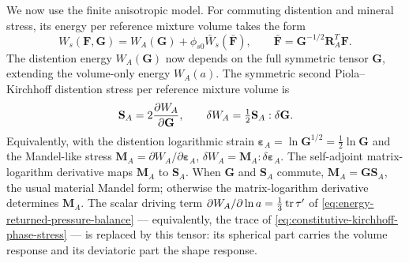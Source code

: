 We now use the finite anisotropic model. For commuting distention and mineral
stress, its energy per reference mixture volume takes the form
\begin{equation}
 W_s(\mathbf F,\mathbf G)=W_A(\mathbf G)
   +\phi_{s0}\bar W_s(\bar{\mathbf F}),\qquad
 \bar{\mathbf F}=\mathbf G^{-1/2}\mathbf R_A^T\mathbf F.
 \label{eq:fabric-equivalent-energy}
\end{equation}
The distention energy \(W_A(\mathbf G)\) now depends on the full symmetric
tensor \(\mathbf G\), extending the volume-only energy \(W_A(a)\). The
symmetric second Piola--Kirchhoff distention stress per reference mixture
volume is
\begin{equation}
 \mathbf S_A=2\frac{\partial W_A}{\partial \mathbf G},\qquad
 \delta W_A=\tfrac12\mathbf S_A:\delta\mathbf G.
 \label{eq:fabric-distention-stress}
\end{equation}
Equivalently, with the distention logarithmic strain
\(\mathbf\varepsilon_A=\ln\mathbf G^{1/2}=\tfrac12\ln\mathbf G\) and
the Mandel-like stress \(\mathbf M_A=\partial W_A/\partial\mathbf\varepsilon_A\),
\(\delta W_A=\mathbf M_A:\delta\mathbf\varepsilon_A\). The self-adjoint
matrix-logarithm derivative maps \(\mathbf M_A\) to \(\mathbf S_A\).
When \(\mathbf G\) and
\(\mathbf S_A\) commute, \(\mathbf M_A=\mathbf G\mathbf S_A\), the
usual material Mandel form; otherwise the matrix-logarithm derivative
determines \(\mathbf M_A\). The scalar driving term
\(\partial W_A/\partial\ln a=\tfrac13\operatorname{tr}\mathbf\tau'\) of
\eqref{eq:energy-returned-pressure-balance} --- equivalently, the trace of
\eqref{eq:constitutive-kirchhoff-phase-stress} --- is replaced by this
tensor:
its spherical part carries the volume response and its deviatoric part the
shape response.

